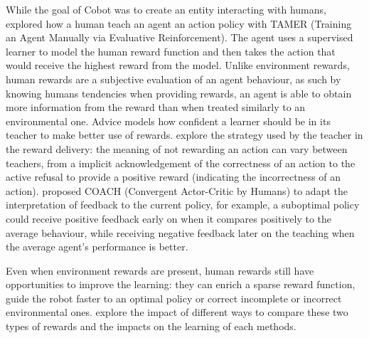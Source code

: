 While the goal of Cobot was to create an entity interacting with humans, \cite{knox2009interactively} explored how a human teach an agent an action policy with TAMER (Training an Agent Manually via Evaluative Reinforcement). The agent uses a supervised learner to model the human reward function and then takes the action that would receive the highest reward from the model. Unlike environment rewards, human rewards are a subjective evaluation of an agent behaviour, as such by knowing humans tendencies when providing rewards, an agent is able to obtain more information from the reward than when treated similarly to an environmental one. Advice \citep{griffith2013policy} models how confident a learner should be in its teacher to make better use of rewards. \cite{loftin2016learning} explore the strategy used by the teacher in the reward delivery: the meaning of not rewarding an action can vary between teachers, from a implicit acknowledgement of the correctness of an action to the active refusal to provide a positive reward (indicating the incorrectness of an action). \cite{macglashan2017interactive} proposed COACH (Convergent Actor-Critic by Humans) to adapt the interpretation of feedback to the current policy, for example, a suboptimal policy could receive positive feedback early on when it compares positively to the average behaviour, while receiving negative feedback later on the teaching when the average agent's performance is better.

Even when environment rewards are present, human rewards still have opportunities to improve the learning: they can enrich a sparse reward function, guide the robot faster to an optimal policy or correct incomplete or incorrect environmental ones. \cite{knox2010combining} explore the impact of different ways to compare these two types of rewards and the impacts on the learning of each methods.



